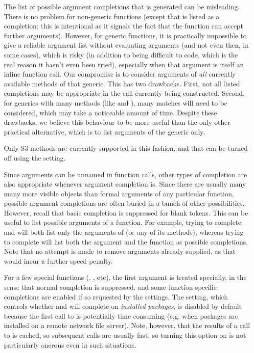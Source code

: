 \begin{Details}
\begin{description}
The list of possible argument completions that is generated can be
misleading.  There is no problem for non-generic functions (except
that  is listed as a completion; this is intentional
as it signals the fact that the function can accept further
arguments).  However, for generic functions, it is practically
impossible to give a reliable argument list without evaluating
arguments (and not even then, in some cases), which is risky (in
addition to being difficult to code, which is the real reason it
hasn't even been tried), especially when that argument is itself
an inline function call.  Our compromise is to consider arguments
of \emph{all} currently available methods of that generic.  This
has two drawbacks.  First, not all listed completions may be
appropriate in the call currently being constructed.  Second, for
generics with many methods (like  and ),
many matches will need to be considered, which may take a
noticeable amount of time.  Despite these drawbacks, we believe
this behaviour to be more useful than the only other practical
alternative, which is to list arguments of the generic only.

Only S3 methods are currently supported in this fashion, and that
can be turned off using the  setting.

Since arguments can be unnamed in \R{} function calls, other types
of completion are also appropriate whenever argument completion
is.  Since there are usually many many more visible objects than
formal arguments of any particular function, possible argument
completions are often buried in a bunch of other possibilities.
However, recall that basic completion is suppressed for blank
tokens.  This can be useful to list possible arguments of a
function.  For example, trying to complete  and
 will both list only the arguments of
 (or any of its methods), whereas trying to complete
 will list both the 
argument and the  function as possible completions.
Note that no attempt is made to remove arguments already supplied,
as that would incur a further speed penalty.


\item[\bold{Special functions}:] 
For a few special functions (,
, etc), the first argument is treated specially,
in the sense that normal completion is suppressed, and some
function specific completions are enabled if so requested by the
settings.  The  setting, which controls whether
 and  will complete on
\emph{installed packages}, is disabled by default because the
first call to  is potentially time
consuming (e.g. when packages are installed on a remote network
file server).  Note, however, that the results of a call to
 is cached, so subsequent calls
are usually fast, so turning this option on is not particularly
onerous even in such situations.





\end{description}
\end{Details}
